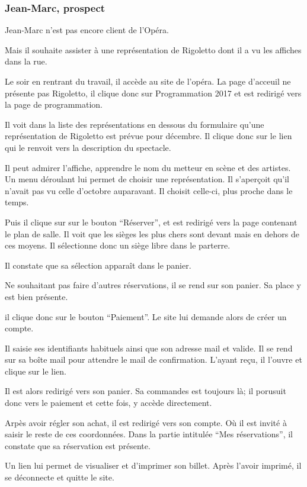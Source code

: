 \subsubsection{Jean-Marc, prospect}\label{jean-marc-prospect}

Jean-Marc n'est pas encore client de l'Opéra.

Mais il souhaite assister à une représentation de Rigoletto dont il a vu
les affiches dans la rue.

Le soir en rentrant du travail, il accède au site de l'opéra. La page
d'acceuil ne présente pas Rigoletto, il clique donc sur Programmation
2017 et est redirigé vers la page de programmation.

Il voit dans la liste des représentations en dessous du formulaire
qu'une représentation de Rigoletto est prévue pour décembre. Il clique
donc sur le lien qui le renvoit vers la description du spectacle.

Il peut admirer l'affiche, apprendre le nom du metteur en scène et des
artistes. Un menu déroulant lui permet de choisir une représentation. Il
s'aperçoit qu'il n'avait pas vu celle d'octobre auparavant. Il choisit
celle-ci, plus proche dans le temps.

Puis il clique sur sur le bouton ``Réserver'', et est redirigé vers la
page contenant le plan de salle. Il voit que les sièges les plus chers
sont devant mais en dehors de ces moyens. Il sélectionne donc un siège
libre dans le parterre.

Il constate que sa sélection apparaît dans le panier.

Ne souhaitant pas faire d'autres réservations, il se rend sur son
panier. Sa place y est bien présente.

il clique donc sur le bouton ``Paiement''. Le site lui demande alors de
créer un compte.

Il saisie ses identifiants habituels ainsi que son adresse mail et
valide. Il se rend sur sa boîte mail pour attendre le mail de
confirmation. L'ayant reçu, il l'ouvre et clique sur le lien.

Il est alors redirigé vers son panier. Sa commandes est toujours là; il
porusuit donc vers le paiement et cette fois, y accède directement.

Arpès avoir régler son achat, il est redirigé vers son compte. Où il est
invité à saisir le reste de ces coordonnées. Dans la partie intitulée
``Mes réservations'', il constate que sa réservation est présente.

Un lien lui permet de visualiser et d'imprimer son billet. Après l'avoir
imprimé, il se déconnecte et quitte le site.
